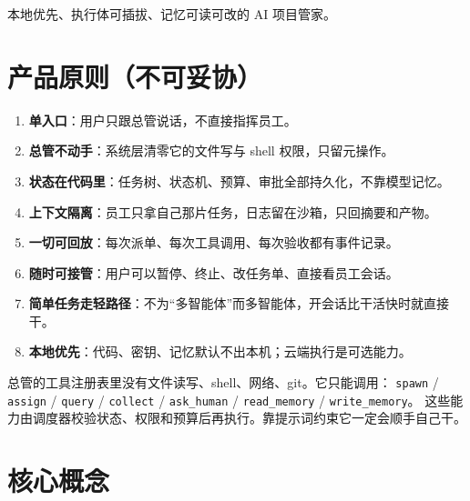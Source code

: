 \documentclass[UTF8,11pt,a4paper,fontset=windows]{ctexart}
\let\ocsection\section
\renewcommand{\section}{\Needspace{8\baselineskip}\ocsection}
\newcommand{\code}[1]{\texttt{#1}}
\begin{document}
\begin{keybox}[定位语]
本地优先、执行体可插拔、记忆可读可改的 AI 项目管家。
\end{keybox}

\section{产品原则（不可妥协）}

\begin{enumerate}
  \item \textbf{单入口}：用户只跟总管说话，不直接指挥员工。
  \item \textbf{总管不动手}：系统层清零它的文件写与 shell 权限，只留元操作。
  \item \textbf{状态在代码里}：任务树、状态机、预算、审批全部持久化，不靠模型记忆。
  \item \textbf{上下文隔离}：员工只拿自己那片任务，日志留在沙箱，只回摘要和产物。
  \item \textbf{一切可回放}：每次派单、每次工具调用、每次验收都有事件记录。
  \item \textbf{随时可接管}：用户可以暂停、终止、改任务单、直接看员工会话。
  \item \textbf{简单任务走轻路径}：不为“多智能体”而多智能体，开会话比干活快时就直接干。
  \item \textbf{本地优先}：代码、密钥、记忆默认不出本机；云端执行是可选能力。
\end{enumerate}

\begin{keybox}
总管的工具注册表里没有文件读写、shell、网络、git。它只能调用：
\code{spawn} / \code{assign} / \code{query} / \code{collect} / \code{ask\_human} / \code{read\_memory} / \code{write\_memory}。
这些能力由调度器校验状态、权限和预算后再执行。靠提示词约束它一定会顺手自己干。
\end{keybox}

\section{核心概念}
\end{document}

